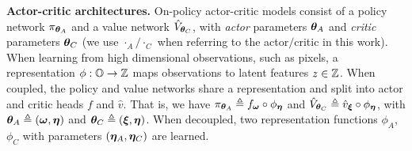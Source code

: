 \textbf{Actor-critic architectures.} On-policy actor-critic models consist of a policy network $\pi_{{\bm{\theta}}_A}$ and a value network $\hat{V}_{{\bm{\theta}}_C}$, with \textit{actor} parameters ${{\bm{\theta}}_A}$ and \textit{critic} parameters ${\bm{\theta}}_C$ (we use $\cdot_A/\cdot_C$ when referring to the actor$/$critic in this work). When learning from high dimensional observations, such as pixels, a representation $\phi:{\mathbb{O}} \rightarrow {\mathbb{Z}}$ maps observations to latent features $z \in {\mathbb{Z}}$. When coupled, the policy and value networks share a representation and split into actor and critic heads $f$ and $\hat{v}$. That is, we have $\pi_{{\bm{\theta}}_A} \triangleq f_{{\bm{\omega}}} \circ \phi_{\bm{\eta}}$ and $\hat{V}_{{\bm{\theta}}_C} \triangleq \hat{v}_{{\bm{\xi}}} \circ \phi_{\bm{\eta}}$, with ${\bm{\theta}}_A\triangleq ({\bm{\omega}},{\bm{\eta}})$ and ${\bm{\theta}}_C \triangleq ({\bm{\xi}},{\bm{\eta}})$. When decoupled, two representation functions $\phi_A$, $\phi_C$ with parameters $({\bm{\eta}}_A,{\bm{\eta}}_C)$ are learned.

